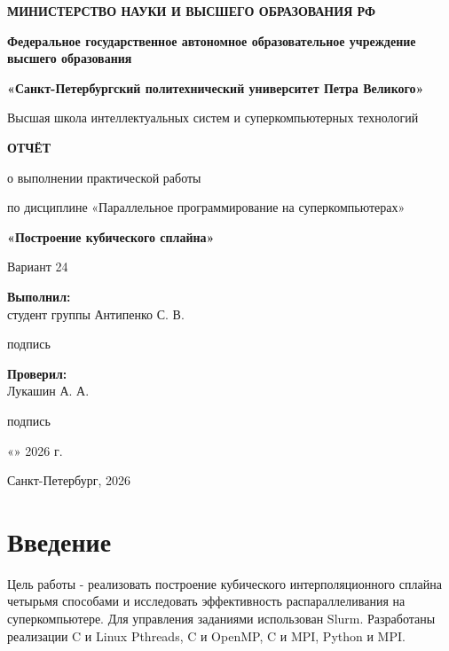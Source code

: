 \documentclass[14pt,a4paper]{extarticle}
\newcommand{\StudentName}{Антипенко С. В.}
\newcommand{\StudentGroup}{\underline{\hspace{2cm}}}
\newcommand{\TeacherName}{Лукашин А. А.}
\begin{document}
\begin{titlepage}
\begin{center}
\textbf{МИНИСТЕРСТВО НАУКИ И ВЫСШЕГО ОБРАЗОВАНИЯ РФ}

\vspace{0.4cm}
\textbf{Федеральное государственное автономное образовательное учреждение высшего образования}

\vspace{0.4cm}
\textbf{«Санкт-Петербургский политехнический университет Петра Великого»}

\vspace{0.6cm}
Высшая школа интеллектуальных систем и суперкомпьютерных технологий

\vfill
\textbf{ОТЧЁТ}

\vspace{0.3cm}
о выполнении практической работы

\vspace{0.5cm}
по дисциплине «Параллельное программирование на суперкомпьютерах»

\vspace{0.7cm}
\textbf{«Построение кубического сплайна»}

\vspace{0.3cm}
Вариант 24
\end{center}
\vspace{0.5cm}
\noindent\textbf{Выполнил:}\\[0.2cm]
студент группы \StudentGroup\hfill\StudentName
\begin{flushright}\small подпись\end{flushright}
\noindent\textbf{Проверил:}\\[0.2cm]
\TeacherName\hfill\underline{\hspace{3cm}}
\begin{flushright}\small подпись\end{flushright}
\vspace{0.3cm}
\begin{flushright}«\underline{\hspace{0.7cm}}» \underline{\hspace{3cm}} 2026 г.\end{flushright}
\vfill
\begin{center}Санкт-Петербург, 2026\end{center}
\end{titlepage}
\setcounter{page}{2}

\tableofcontents
\clearpage
\section{Введение}
Цель работы - реализовать построение кубического интерполяционного сплайна четырьмя способами и исследовать эффективность распараллеливания на суперкомпьютере. Для управления заданиями использован Slurm. Разработаны реализации C и Linux Pthreads, C и OpenMP, C и MPI, Python и MPI.
\end{document}
